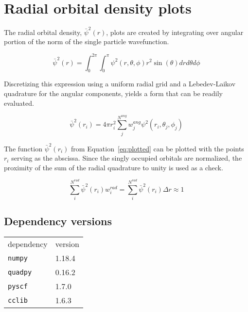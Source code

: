 \section{Radial orbital density plots}
The radial orbital density, $\bar{\psi}^2(r)$, plots are created by integrating over angular portion of the norm of the single particle wavefunction.

\begin{equation}
    \bar{\psi}^2(r) = \int_0^{2\pi}\int_0^{\pi} \psi^2(r,\theta,\phi) r^2 \sin(\theta) dr d\theta d\phi
\end{equation}

Discretizing this expression using a uniform radial grid and a Lebedev-Laikov quadrature for the angular components, yields a form that can be readily evaluated.

\begin{equation}\label{eq:plotted}
    \bar{\psi}^2(r_i) = 4 \pi {r_i^2}  \sum_j^{N^{ang}} w^{ang}_j \psi^2(r_i,\theta_j,\phi_j) 
\end{equation}

The function $\bar{\psi}^2(r_i)$ from Equation~\ref{eq:plotted} can be plotted with the points $r_i$ serving as the abscissa.
Since the singly occupied orbitals are normalized, the proximity of the sum of the radial quadrature to unity is used as a check.

\begin{equation}\label{eq:norm}
    \sum_i^{N^{rad}} \bar{\psi}^2(r_i) w^{rad}_i = \sum_i^{N^{rad}} \bar{\psi}^2(r_i) {\Delta}r \approx  1
\end{equation}

\subsection{Dependency versions}
\begin{table}[H]
\begin{tabular}{ll}
dependency      & version     \\
\texttt{numpy}  & 1.18.4      \\
\texttt{quadpy} & 0.16.2      \\
\texttt{pyscf}  & 1.7.0       \\
\texttt{cclib}  & 1.6.3       \\
\end{tabular}   
\end{table}



